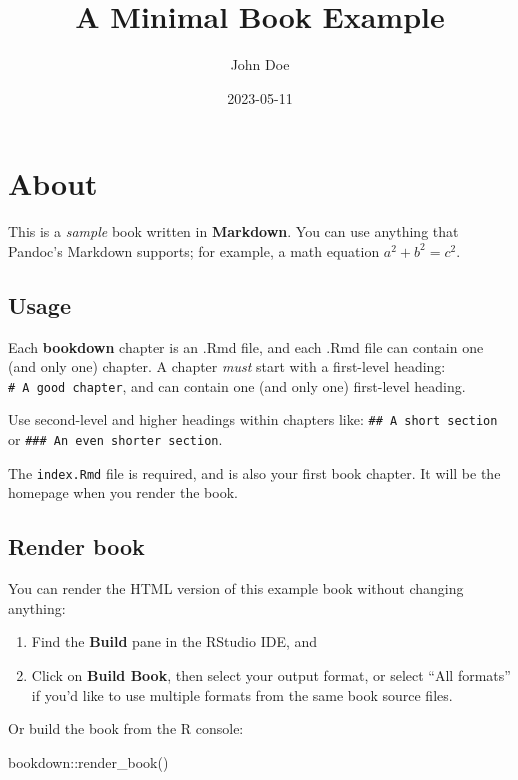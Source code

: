 \documentclass[
]{book}
\title{A Minimal Book Example}
\author{John Doe}
\date{2023-05-11}
\newenvironment{Shaded}{\begin{snugshade}}{\end{snugshade}}
\newcommand{\FunctionTok}[1]{\textcolor[rgb]{0.00,0.00,0.00}{#1}}
\newcommand{\NormalTok}[1]{#1}
\newcommand{\SpecialCharTok}[1]{\textcolor[rgb]{0.00,0.00,0.00}{#1}}
\theoremstyle{definition}
\theoremstyle{definition}
\theoremstyle{definition}
\theoremstyle{definition}
\theoremstyle{remark}
\begin{document}
\maketitle

{
\setcounter{tocdepth}{1}
\tableofcontents
}
\hypertarget{about}{%
\chapter{About}\label{about}}

This is a \emph{sample} book written in \textbf{Markdown}. You can use anything that Pandoc's Markdown supports; for example, a math equation \(a^2 + b^2 = c^2\).

\hypertarget{usage}{%
\section{Usage}\label{usage}}

Each \textbf{bookdown} chapter is an .Rmd file, and each .Rmd file can contain one (and only one) chapter. A chapter \emph{must} start with a first-level heading: \texttt{\#\ A\ good\ chapter}, and can contain one (and only one) first-level heading.

Use second-level and higher headings within chapters like: \texttt{\#\#\ A\ short\ section} or \texttt{\#\#\#\ An\ even\ shorter\ section}.

The \texttt{index.Rmd} file is required, and is also your first book chapter. It will be the homepage when you render the book.

\hypertarget{render-book}{%
\section{Render book}\label{render-book}}

You can render the HTML version of this example book without changing anything:

\begin{enumerate}
\def\labelenumi{\arabic{enumi}.}
\item
  Find the \textbf{Build} pane in the RStudio IDE, and
\item
  Click on \textbf{Build Book}, then select your output format, or select ``All formats'' if you'd like to use multiple formats from the same book source files.
\end{enumerate}

Or build the book from the R console:

\begin{Shaded}
\begin{Highlighting}[]
\NormalTok{bookdown}\SpecialCharTok{::}\FunctionTok{render\_book}\NormalTok{()}
\end{Highlighting}
\end{Shaded}
\end{document}
